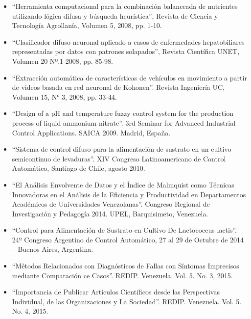 \begin{footnotesize}
\begin{flushleft}
\begin{itemize}
\item “Herramienta computacional para la combinación balanceada de nutrientes utilizando lógica difusa y búsqueda heurística”, Revista de Ciencia y Tecnología Agrollanía, Volumen 5, 2008, pp. 1-10.
\item “Clasificador difuso neuronal aplicado a casos de enfermedades hepatobiliares representadas por datos con patrones solapados”,  Revista  Científica UNET, Volumen 20 Nº,1 2008, pp. 85-98.
\item “Extracción automática de características de vehículos en movimiento a partir de videos basada en red neuronal de Kohonen”.  Revista   Ingeniería UC, Volumen 15, N° 3, 2008, pp. 33-44.
\item “Design of a pH and temperature fuzzy control system for the production process of liquid ammonium nitrate”. 3rd Seminar for Advanced Industrial Control Applications. SAICA 2009. Madrid, España. 
\item “Sistema de control difuso para la alimentación de sustrato en un cultivo semicontinuo de levaduras”. XIV Congreso Latinoamericano de Control Automático, Santiago de Chile, agosto 2010.
\item “El Análisis Envolvente de Datos y el Índice de Malmquist como Técnicas Innovadoras en el Análisis de la Eficiencia y Productividad en Departamentos Académicos de Universidades Venezolanas”. Congreso Regional de Investigación y Pedagogía 2014. UPEL, Barquisimeto, Venezuela.
\item “Control para Alimentación de Sustrato en Cultivo De Lactococcus lactis”. 24º Congreso Argentino de Control Automático, 27 al 29 de Octubre de 2014 – Buenos Aires, Argentina.
\item “Métodos Relacionados con Diagnósticos de Fallas con Síntomas Imprecisos mediante Comparación ce Casos”. REDIP. Venezuela. Vol. 5. No. 3, 2015.
\item “Importancia de Publicar Artículos Científicos desde las Perspectivas Individual, de las Organizaciones y La Sociedad”. REDIP. Venezuela. Vol. 5. No. 4, 2015.

\end{itemize}
\end{flushleft}
\end{footnotesize}